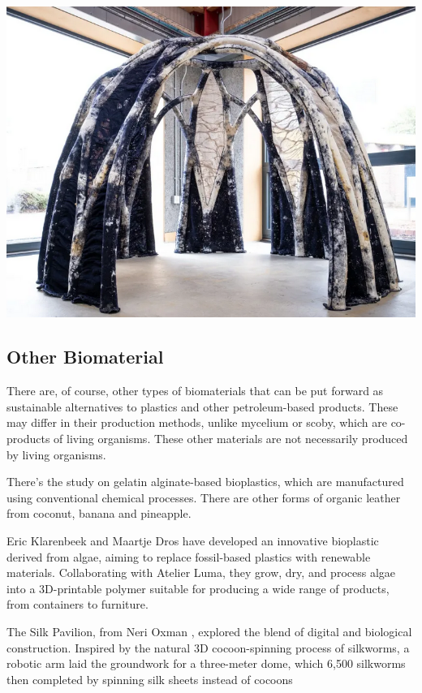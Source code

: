 \begin{marginfigure}
    \centering
    \includegraphics{images/Hbbe_bioknit.png}    
    \caption{}
    \label{fig:mycohbbe}
\end{marginfigure}



\subsection{Other Biomaterial}

There are, of course, other types of biomaterials that can be put forward as sustainable alternatives to plastics and other petroleum-based products. 
These may differ in their production methods, unlike mycelium or scoby, which are co-products of living organisms. These other materials are not necessarily produced by living organisms. 

There's the study on gelatin alginate-based bioplastics, which are manufactured using conventional chemical processes. 
There are other forms of organic leather from coconut, banana and pineapple.

Eric Klarenbeek and Maartje Dros have developed an innovative bioplastic derived from algae\cite{algaelab}, aiming to replace fossil-based plastics with renewable materials. Collaborating with Atelier Luma, they grow, dry, and process algae into a 3D-printable polymer suitable for producing a wide range of products, from containers to furniture.

The Silk Pavilion, from Neri Oxman , explored the blend of digital and biological construction. Inspired by the natural 3D cocoon-spinning process of silkworms, a robotic arm laid the groundwork for a three-meter dome, which 6,500 silkworms then completed by spinning silk sheets instead of cocoons

